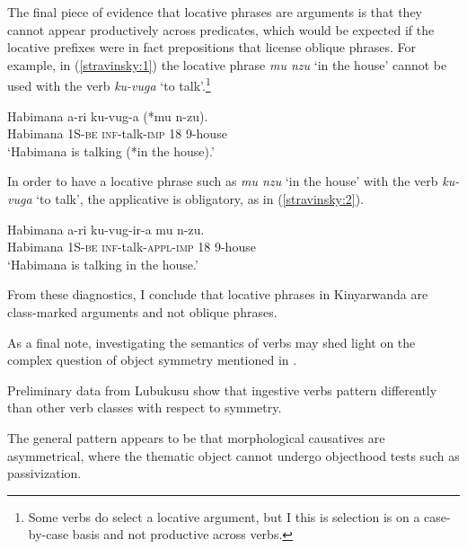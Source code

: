 \documentclass[output=paper]{langsci/langscibook}
\begin{document}
 The final piece of evidence that locative phrases are arguments is that they cannot appear productively across predicates, which would be expected if the locative prefixes were in fact prepositions that license oblique phrases. For example, in (\ref{stravinsky:1}) the locative phrase \emph{mu nzu} `in the house' cannot be used with the verb \emph{ku-vuga} `to talk'.\footnote{Some verbs do select a locative argument, but I this is selection is on a case-by-case basis and not productive across verbs.}
 \begin{exe}
\ex\label{stravinsky:1}\gll Habimana a-ri ku-vug-a (*mu n-zu).\\
			Habimana 1S-{\scshape be} {\scshape inf}-talk-{\scshape imp} \phantom{(*}18 9-house\\%
				\glt `Habimana is talking (*in the house).'
\end{exe}
In order to have a locative phrase such as \emph{mu nzu} `in the house' with the verb \emph{ku-vuga} `to talk', the applicative is obligatory, as in (\ref{stravinsky:2}).
\begin{exe}
\ex\label{stravinsky:2}\gll Habimana a-ri ku-vug-ir-a mu n-zu.\\
			Habimana 1S-{\scshape be} {\scshape inf}-talk-{\scshape appl-imp} 18 9-house\\
				\glt `Habimana is talking in the house.'
\end{exe}
 From these diagnostics, I conclude that  locative phrases in Kinyarwanda are class-marked arguments and not oblique phrases. 
 
\iffalse 
  As a final note, investigating the semantics of verbs may shed light on the complex question of  object symmetry mentioned in . 
 
  Preliminary data from Lubukusu show that ingestive verbs pattern differently than other verb classes with respect to symmetry. 
 
  The general pattern appears to be that morphological causatives are asymmetrical, where the thematic object cannot undergo objecthood tests such as passivization.
 
\end{document}
